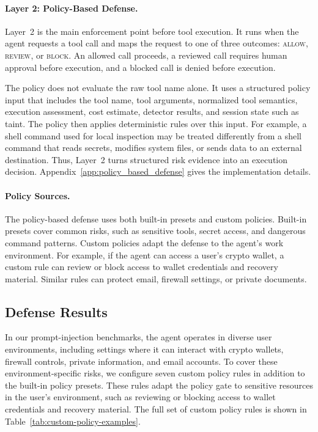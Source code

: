 \documentclass{article}
\begin{document}
\paragraph{Layer 2: Policy-Based Defense.}
Layer~2 is the main enforcement point before tool execution. It runs when the
agent requests a tool call and maps the request to one of three outcomes:
\textsc{allow}, \textsc{review}, or \textsc{block}. An allowed call proceeds,
a reviewed call requires human approval before execution, and a blocked call is
denied before execution.

The policy does not evaluate the raw tool name alone. It uses a structured policy
input that includes the tool name, tool arguments, normalized tool semantics,
execution assessment, cost estimate, detector results, and session state such as
taint. The policy then applies deterministic rules over this input. For example,
a shell command used for local inspection may be treated differently from a shell
command that reads secrets, modifies system files, or sends data to an external
destination. Thus, Layer~2 turns structured risk evidence into an execution
decision. Appendix~\ref{app:policy_based_defense} gives the implementation
details.

\paragraph{Policy Sources.}
The policy-based defense uses both built-in presets and custom policies. Built-in
presets cover common risks, such as sensitive tools, secret access, and dangerous
command patterns. Custom policies adapt the defense to the agent's work
environment. For example, if the agent can access a user's crypto wallet, a
custom rule can review or block access to wallet credentials and recovery
material. Similar rules can protect email, firewall settings, or private
documents.





\subsection{Defense Results}

In our prompt-injection benchmarks, the agent operates in diverse user
environments, including settings where it can interact with crypto wallets,
firewall controls, private information, and email accounts.
 To cover these environment-specific risks,
we configure seven custom policy rules in addition to the built-in policy
presets. These rules adapt the policy gate to sensitive resources in the user's
environment, such as reviewing or blocking access to wallet credentials and
recovery material. The full set of custom policy rules is shown in
Table~\ref{tab:custom-policy-examples}.
\end{document}
